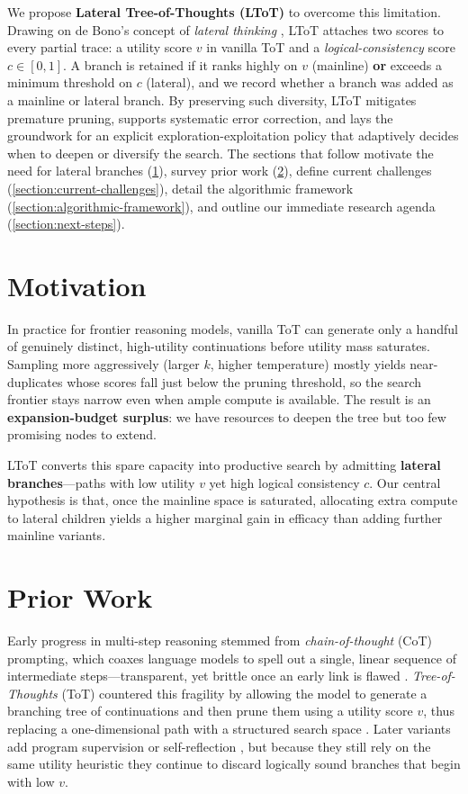 \documentclass{IEEEtran}
\begin{document}
We propose \textbf{Lateral Tree-of-Thoughts (LToT)} to overcome this limitation.
Drawing on de Bono's concept of \textit{lateral thinking} \cite{debono1967lateral}, LToT attaches two scores to every partial trace: a utility score $v$ in vanilla ToT and a \textit{logical-consistency} score $c \in [0, 1]$.
A branch is retained if it ranks highly on $v$ (mainline) \textbf{or} exceeds a minimum threshold on $c$ (lateral), and we record whether a branch was added as a mainline or lateral branch.
By preserving such diversity, LToT mitigates premature pruning, supports systematic error correction, and lays the groundwork for an explicit exploration-exploitation policy that adaptively decides when to deepen or diversify the search.
The sections that follow motivate the need for lateral branches (\ref{section:motivation}), survey prior work (\ref{section:prior-work}), define current challenges (\ref{section:current-challenges}), detail the algorithmic framework (\ref{section:algorithmic-framework}), and outline our immediate research agenda (\ref{section:next-steps}).


\section{Motivation}
\label{section:motivation}

In practice for frontier reasoning models, vanilla ToT can generate only a handful of genuinely distinct, high-utility continuations before utility mass saturates.
Sampling more aggressively (larger $k$, higher temperature) mostly yields near-duplicates whose scores fall just below the pruning threshold, so the search frontier stays narrow even when ample compute is available.
The result is an \textbf{expansion-budget surplus}: we have resources to deepen the tree but too few promising nodes to extend.

LToT converts this spare capacity into productive search by admitting \textbf{lateral branches}---paths with low utility $v$ yet high logical consistency $c$.
Our central hypothesis is that, once the mainline space is saturated, allocating extra compute to lateral children yields a higher marginal gain in efficacy than adding further mainline variants.


\section{Prior Work}
\label{section:prior-work}

Early progress in multi-step reasoning stemmed from \textit{chain-of-thought} (CoT) prompting, which coaxes language models to spell out a single, linear sequence of intermediate steps—transparent, yet brittle once an early link is flawed \cite{wei2022cot}.
\textit{Tree-of-Thoughts} (ToT) countered this fragility by allowing the model to generate a branching tree of continuations and then prune them using a utility score $v$, thus replacing a one-dimensional path with a structured search space \cite{yao2023tot}.
Later variants add program supervision \cite{gao2022pal} or self-reflection \cite{madaan2023selfrefine}, but because they still rely on the same utility heuristic they continue to discard logically sound branches that begin with low $v$.
\end{document}
